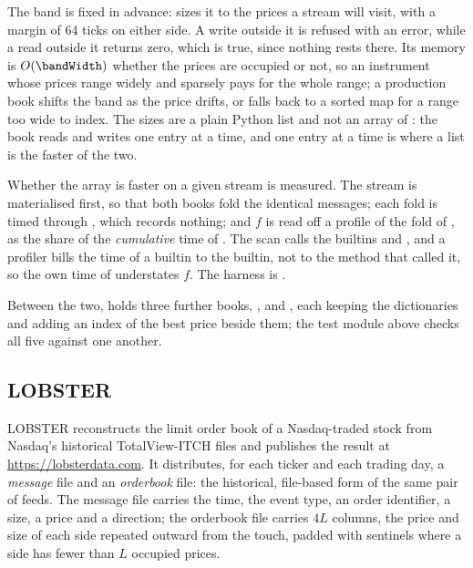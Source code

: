 The band is fixed in advance:  sizes it
to the prices a stream will visit, with a margin of 64 ticks on either side.
A write outside it is refused with an error,
while a read outside it returns zero, which is true, since nothing rests there.
Its memory is $O(\bandWidth)$ whether the prices are occupied or not,
so an instrument whose prices range widely and sparsely pays for the whole range;
a production book shifts the band as the price drifts,
or falls back to a sorted map for a range too wide to index.
The sizes are a plain Python list and not an array of :
the book reads and writes one entry at a time,
and one entry at a time is where a list is the faster of the two.

Whether the array is faster on a given stream is measured.
The stream is materialised first, so that both books fold the identical messages;
each fold is timed through , which records nothing;
and $f$ is read off a profile of the fold of , as the share of the
\emph{cumulative} time of .
The scan calls the builtins  and ,
and a profiler bills the time of a builtin to the builtin, not to the method that called it,
so the own time of  understates $f$.
The harness is .

Between the two,  holds three further books,
,  and ,
each keeping the dictionaries and adding an index of the best price beside them;
the test module above checks all five against one another.

\subsection{LOBSTER}

LOBSTER \cite{HP11lob} reconstructs the limit order book of a Nasdaq-traded stock from
Nasdaq's historical TotalView-ITCH files and publishes the result at
\url{https://lobsterdata.com}.
It distributes, for each ticker and each trading day,
a \emph{message} file and an \emph{orderbook} file:
the historical, file-based form of the same pair of feeds.
The message file carries the time, the event type, an order identifier, a size, a price and a
direction;
the orderbook file carries $4L$ columns, the price and size of each side repeated outward
from the touch, padded with sentinels where a side has fewer than $L$ occupied prices.

